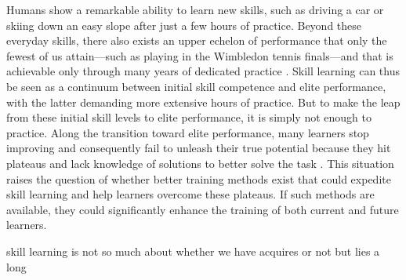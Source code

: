 
Humans show a remarkable ability to learn new skills, such as driving a car or skiing down an easy slope after just a few hours of practice. Beyond these everyday skills, there also exists an upper echelon of performance that only the fewest of us attain—such as playing in the Wimbledon tennis finals—and that is achievable only through many years of dedicated practice \cite{hodges_predicting_2004, ericsson_role_1993, vaeyens_talent_2009}. Skill learning can thus be seen as a continuum between initial skill competence and elite performance, with the latter demanding more extensive hours of practice. But to make the leap from these initial skill levels to elite performance, it is simply not enough to practice. Along the transition toward elite performance, many learners stop improving and consequently fail to unleash their true potential because they hit plateaus and lack knowledge of solutions to better solve the task \cite{thorndike_educational_1913, grayloooooong,grayshort,ericsson_scientific_1998, ericsson_development_2003}. This situation raises the question of whether better training methods exist that could expedite skill learning and help learners overcome these plateaus. If such methods are available, they could significantly enhance the training of both current and future learners. 

skill learning is not so much about whether we have acquires or not but lies a long 








